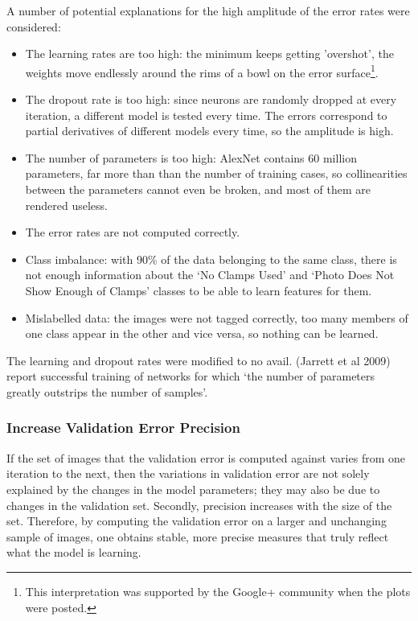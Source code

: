 \documentclass[a4paper,11pt]{article}
\begin{document}
A number of potential explanations for the high amplitude of the error rates were considered:
\begin{itemize}
\item The learning rates are too high: the minimum keeps getting 'overshot', the weights move endlessly around the rims of a bowl on the error surface\footnote{This interpretation was supported by the Google+ community when the plots were posted.}.
\item The dropout rate is too high: since neurons are randomly dropped at every iteration, a different model is tested every time. The errors correspond to partial derivatives of different models every time, so the amplitude is high. 
\item The number of parameters is too high: AlexNet contains 60 million parameters, far more than than the number of training cases, so collinearities between the parameters cannot even be broken, and most of them are rendered useless.
\item The error rates are not computed correctly.
\item Class imbalance: with 90\% of the data belonging to the same class, there is not enough information about the `No Clamps Used' and `Photo Does Not Show Enough of Clamps' classes to be able to learn features for them.
\item Mislabelled data: the images were not tagged correctly, too many members of one class appear in the other and vice versa, so nothing can be learned.
\end{itemize}

The learning and dropout rates were modified to no avail. (Jarrett et al 2009) report successful training of networks for which `the number of parameters greatly outstrips the number of samples'.

\subsubsection{Increase Validation Error Precision}

If the set of images that the validation error is computed against varies from one iteration to the next, then the variations in validation error are not solely explained by the changes in the model parameters; they may also be due to changes in the validation set. Secondly, precision increases with the size of the set. Therefore, by computing the validation error on a larger and unchanging sample of images, one obtains stable, more precise measures that truly reflect what the model is learning. 
\end{document}
